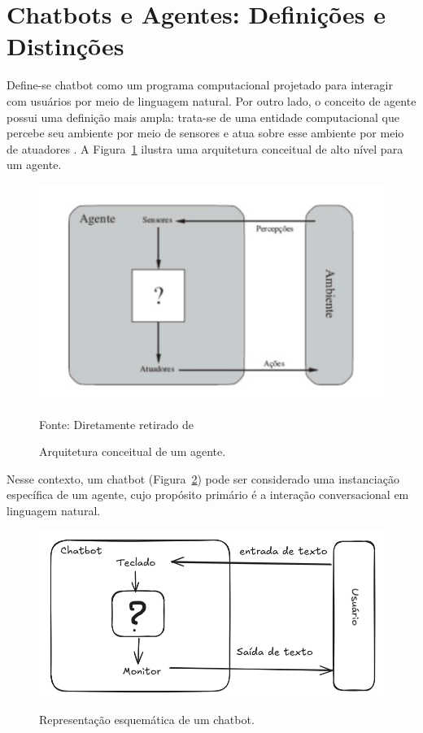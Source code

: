 \documentclass[14pt,a4paper,oneside]{book}
\begin{document}


\section{Chatbots e Agentes: Definições e Distinções}

Define-se chatbot como um programa computacional projetado para interagir com usuários por meio de linguagem natural. Por outro lado, o conceito de agente possui uma definição mais ampla: trata-se de uma entidade computacional que percebe seu ambiente por meio de sensores e atua sobre esse ambiente por meio de atuadores \cite{Russel2013}. A Figura~\ref{fig:agente} ilustra uma arquitetura conceitual de alto nível para um agente.

\begin{figure}
	\centering
	\caption{Arquitetura conceitual de um agente.}
	\includegraphics[width=0.7\linewidth]{./fig/ia.png}
	\label{fig:agente}
	{\footnotesize \centering

		Fonte: Diretamente retirado de \cite{Russel2013}}
\end{figure}

Nesse contexto, um chatbot (Figura~\ref{fig:chatbot}) pode ser considerado uma instanciação específica de um agente, cujo propósito primário é a interação conversacional em linguagem natural.

\begin{figure}
	\centering
	\caption{Representação esquemática de um chatbot.}
	\includegraphics[width=0.9\linewidth]{./fig/chatbot.png}
	\label{fig:chatbot}

\end{figure}
\end{document}
